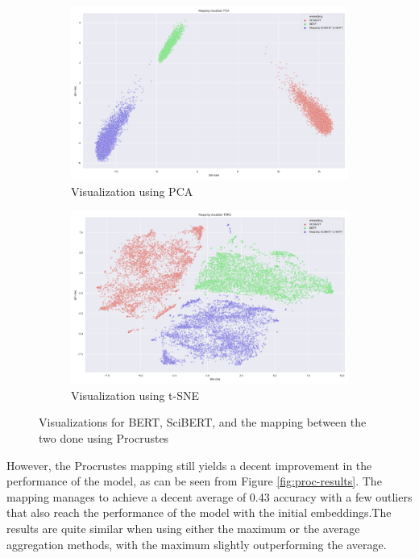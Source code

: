 \documentclass[12pt]{extreport}
\begin{document}
\begin{figure}[H]
\centering
\begin{subfigure}{.49\textwidth}
\centering
\includegraphics[width=\linewidth]{assets/addressing-change/mapping_vis_pca_SCIBERT_BERT_average.png}
\caption{Visualization using PCA}
\label{fig:proc-pca}
\end{subfigure}
\begin{subfigure}{.49\textwidth}
\centering
\includegraphics[width=\linewidth]{assets/addressing-change/mapping_vis_tsne_SCIBERT_BERT_average.png}
\caption{Visualization using t-SNE}
\label{fig:proc-tsne}
\end{subfigure}
\caption{Visualizations for BERT, SciBERT, and the mapping between the two done using Procrustes}
\label{fig:proc-viz}
\end{figure}

However, the Procrustes mapping still yields a decent improvement in the performance of the model, as can be seen from Figure \ref{fig:proc-results}. The mapping manages to achieve a decent average of 0.43 accuracy with a few outliers that also reach the performance of the model with the initial embeddings.The results are quite similar when using either the maximum or the average aggregation methods, with the maximum slightly outperforming the average.
\end{document}

